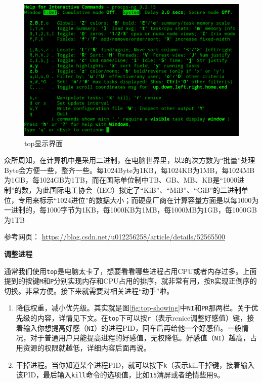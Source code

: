 \documentclass[doctor,openright,twoside]{sjtuthesis}
\providecommand{\tightlist}{%
    \setlength{\itemsep}{0pt}\setlength{\parskip}{0pt}}
\newcommand{\passthrough}[1]{#1}
\theoremstyle{plain}
\theoremstyle{definition}
\theoremstyle{remark}
\theoremstyle{ocrenumbox}
\theoremstyle{plain}
\newcommand\cqh{“}
\newcommand\cqt{”}
\let\BeginKnitrBlock\begin \let\EndKnitrBlock\end
\begin{document}
\begin{figure}

{\centering \includegraphics[width=1\linewidth]{images/top-help} 

}

\caption[top显示界面]{top显示界面}\label{fig:top-help}
\end{figure}

\BeginKnitrBlock{rmdtip}
众所周知，在计算机中是采用二进制，在电脑世界里，以2的次方数为``批量''处理Byte会方便一些，整齐一些。每1024Byte为1KB，每1024KB为1MB，每1024MB为1GB，每1024GB为1TB，而在国际单位制中TB、GB、MB、KB是``1000进制''的数，为此国际电工协会（IEC）拟定了``KiB''、``MiB''、``GiB''的二进制单位，专用来标示``1024进位''的数据大小；而硬盘厂商在计算容量方面是以每1000为一进制的，每1000字节为1KB，每1000KB为1MB，每1000MB为1GB，每1000GB为1TB

参考网页：
\url{https://blog.csdn.net/u012256258/article/details/52565500}
\EndKnitrBlock{rmdtip}

\textbf{调整进程}

通常我们使用\passthrough{\lstinline!top!}是电脑太卡了，想要看看哪些进程占用CPU或者内存过多。上面提到的按键\passthrough{\lstinline!M!}和\passthrough{\lstinline!P!}分别实现内存和CPU占用的排序，就非常有用，按\passthrough{\lstinline!R!}实现正倒序的切换。非常方便。接下来就需要对相关进程\cqh 动手\cqt 啦。

\begin{enumerate}
\def\labelenumi{\arabic{enumi}.}
\tightlist
\item
  降低权重，减小优先级。其实就是图\ref{fig:top-showing}中\passthrough{\lstinline!NI!}和\passthrough{\lstinline!PR!}那两栏。关于优先级的内容，详情见下文。在\passthrough{\lstinline!top!}下可以按\passthrough{\lstinline!r!}（表示renice调整好感值）键，接着输入你想提高好感（\passthrough{\lstinline!NI!}）的进程PID，回车后再给他一个好感值。一般情况，对于普通用户只能提高进程的好感值，无权降低。好感值（\passthrough{\lstinline!NI!}）越高，占用资源的权限就越低，详细内容后面再说。
\item
  干掉进程。当你知道某个进程PID，就可以按下\passthrough{\lstinline!k!}（表示kill干掉键，接着输入该PID，最后输入\passthrough{\lstinline!kill!}命令的选项值，比如\passthrough{\lstinline!15!}清屏或者绝情些用\passthrough{\lstinline!9!}。
\end{enumerate}
\end{document}
